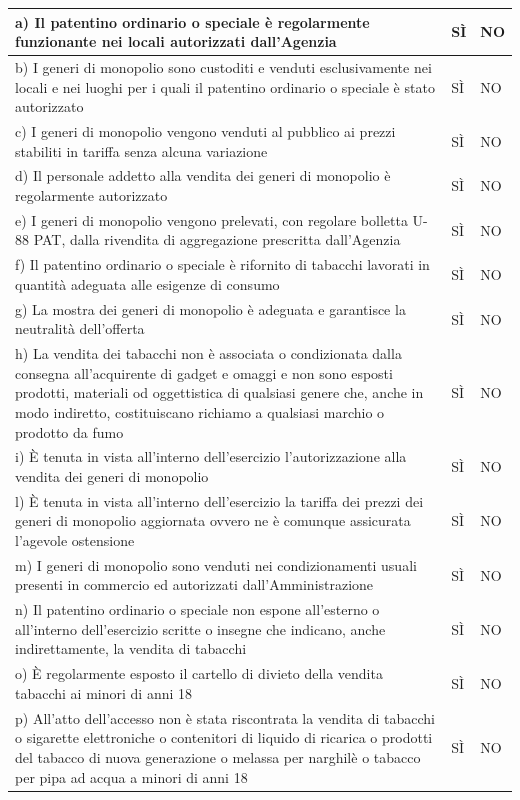 \documentclass[12pt]{article}
\begin{document}
\begin{tabularx}{\textwidth}{|p{15cm}|Y|Y|}
    \hline
    a) Il patentino ordinario o speciale è regolarmente funzionante nei locali autorizzati dall'Agenzia & SÌ & NO \\
    \hline
    b) I generi di monopolio sono custoditi e venduti esclusivamente nei locali e nei luoghi per i quali il patentino ordinario o speciale è stato autorizzato & SÌ & NO \\
    \hline
    c) I generi di monopolio vengono venduti al pubblico ai prezzi stabiliti in tariffa senza alcuna variazione & SÌ & NO \\
    \hline
    d) Il personale addetto alla vendita dei generi di monopolio è regolarmente autorizzato & SÌ & NO \\
    \hline
    e) I generi di monopolio vengono prelevati, con regolare bolletta U-88 PAT, dalla rivendita di aggregazione prescritta dall'Agenzia & SÌ & NO \\
    \hline
    f) Il patentino ordinario o speciale è rifornito di tabacchi lavorati in quantità adeguata alle esigenze di consumo & SÌ & NO \\
    \hline
    g) La mostra dei generi di monopolio è adeguata e garantisce la neutralità dell'offerta & SÌ & NO \\
    \hline
    h) La vendita dei tabacchi non è associata o condizionata dalla consegna all'acquirente di gadget e omaggi e non sono esposti prodotti, materiali od oggettistica di qualsiasi genere che, anche in modo indiretto, costituiscano richiamo a qualsiasi marchio o prodotto da fumo & SÌ & NO \\
    \hline
    i) È tenuta in vista all'interno dell'esercizio l'autorizzazione alla vendita dei generi di monopolio & SÌ & NO \\
    \hline
    l) È tenuta in vista all'interno dell'esercizio la tariffa dei prezzi dei generi di monopolio aggiornata ovvero ne è comunque assicurata l'agevole ostensione & SÌ & NO \\
    \hline
    m) I generi di monopolio sono venduti nei condizionamenti usuali presenti in commercio ed autorizzati dall'Amministrazione & SÌ & NO \\
    \hline
    n) Il patentino ordinario o speciale non espone all'esterno o all'interno dell'esercizio scritte o insegne che indicano, anche indirettamente, la vendita di tabacchi & SÌ & NO \\
    \hline
    o) È regolarmente esposto il cartello di divieto della vendita tabacchi ai minori di anni 18 & SÌ & NO \\
    \hline
    p) All'atto dell'accesso non è stata riscontrata la vendita di tabacchi o sigarette elettroniche o contenitori di liquido di ricarica o prodotti del tabacco di nuova generazione o melassa per narghilè o tabacco per pipa ad acqua a minori di anni 18  & SÌ & NO \\
    \hline

\end{tabularx}
\end{document}
